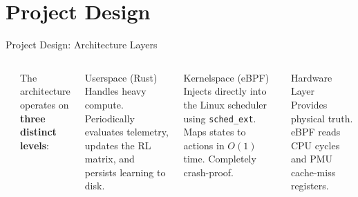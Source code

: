 \documentclass[aspectratio=169]{beamer}
\begin{document}
\section{Project Design}

\begin{frame}{Project Design: Architecture Layers}
  \begin{columns}[T]
    
      \vspace{0.5cm}
      \begin{center}
      \end{center}
    
      \small
      The architecture operates on \textbf{three distinct levels}:
      
      \vspace{4pt}
      
      \begin{block}{Userspace (Rust)}
        Handles heavy compute. Periodically evaluates telemetry, updates the RL matrix, and persists learning to disk.
      \end{block}
      
      \vspace{4pt}
      
      \begin{block}{Kernelspace (eBPF)}
        Injects directly into the Linux scheduler using \texttt{sched\_ext}. Maps states to actions in $O(1)$ time. Completely crash-proof.
      \end{block}
      
      \vspace{4pt}
      
      \begin{block}{Hardware Layer}
        Provides physical truth. eBPF reads CPU cycles and PMU cache-miss registers.
      \end{block}

  \end{columns}
\end{frame}
\end{document}

